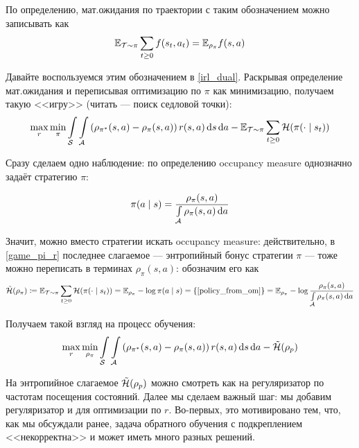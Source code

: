 По определению, мат.ожидания по траектории с таким обозначением можно записывать как
$$\mathbb{E}_{\mathcal{T} \sim \pi} \sum_{t \ge 0} f(s_t, a_t) = \mathbb{E}_{\rho_{\pi}} f(s, a)$$

Давайте воспользуемся этим обозначением в \eqref{irl_dual}. Раскрывая определение мат.ожидания и переписывая оптимизацию по $\pi$ как минимизацию, получаем такую <<игру>> (читать --- поиск седловой точки):
\begin{equation}\label{game_pi_r}
\max\limits_{r} \min\limits_{\pi} \int\limits_{\mathcal{S}} \int\limits_{\mathcal{A}} \left(\rho_{\pi^*}(s, a) - \rho_\pi(s, a)\right) r(s, a) \mathop{}\!\mathrm{d} s \mathop{}\!\mathrm{d} a - \mathbb{E}_{\mathcal{T} \sim \pi} \sum_{t \ge 0} \mathcal{H}(\pi(\cdot \mid s_t))
\end{equation}

Сразу сделаем одно наблюдение: по определению occupancy measure однозначно задаёт стратегию $\pi$:

\begin{proposition}
\begin{equation}\label{policy_from_om}
\pi(a \mid s) = \frac{\rho_\pi(s, a)}{\int\limits_{\mathcal{A}} \rho_\pi(s, a) \mathop{}\!\mathrm{d} a}
\end{equation}
\end{proposition}

Значит, можно вместо стратегии искать occupancy measure: действительно, в \eqref{game_pi_r} последнее слагаемое --- энтропийный бонус стратегии $\pi$ --- тоже можно переписать в терминах $\rho_\pi(s, a)$: обозначим его как
$$\tilde{\mathcal{H}}(\rho_\pi) \coloneqq \mathbb{E}_{\mathcal{T} \sim \pi} \sum_{t \ge 0} \mathcal{H}(\pi(\cdot \mid s_t)) = \mathbb{E}_{\rho_\pi} -\log \pi(a \mid s) = \{ \text{\eqref{policy_from_om}} \} = \mathbb{E}_{\rho_\pi} -\log \frac{\rho_\pi(s, a)}{\int\limits_{\mathcal{A}} \rho_\pi(s, a) \mathop{}\!\mathrm{d} a}$$

Получаем такой взгляд на процесс обучения:
\begin{equation}\label{game_pi_rho}
\max\limits_{r} \min\limits_{\rho_\pi} \int\limits_{\mathcal{S}} \int\limits_{\mathcal{A}} \left(\rho_{\pi^*}(s, a) - \rho_\pi(s, a)\right) r(s, a) \mathop{}\!\mathrm{d} s \mathop{}\!\mathrm{d} a - \tilde{\mathcal{H}}(\rho_p)
\end{equation}

На энтропийное слагаемое $\tilde{\mathcal{H}}(\rho_p)$ можно смотреть как на регуляризатор по частотам посещения состояний. Далее мы сделаем важный шаг: мы добавим регуляризатор и для оптимизации по $r$. Во-первых, это мотивировано тем, что, как мы обсуждали ранее, задача обратного обучения с подкреплением <<некорректна>> и может иметь много разных решений. 

